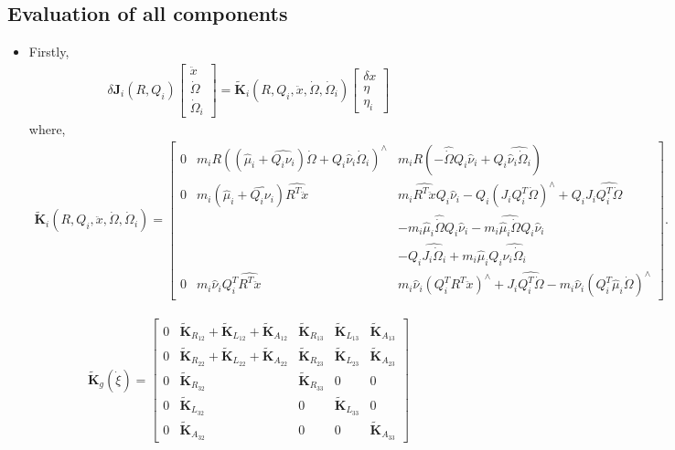 \documentclass[10pt]{article}
\begin{document}
\subsection*{Evaluation of all components}
\begin{itemize}
\item  Firstly,
\begin{align*}
\delta \mathbf{J}_i(R,Q_i) \begin{bmatrix}
\ddot{x} \\ \dot{\Omega} \\ \dot{\Omega}_i
\end{bmatrix} = 
\tilde{\mathbf{K}}_i(R, Q_i, \ddot{x}, \dot{\Omega}, \dot{\Omega}_i)
\begin{bmatrix}
\delta x \\ \eta \\ \eta_i
\end{bmatrix}
\end{align*}
where,
\begin{align*}
\tilde{\mathbf{K}}_i(R,Q_i,\ddot{x},\dot{\Omega},\dot{\Omega}_i) = 
\begin{bmatrix}
0 & m_i R ((\hat\mu_i+\widehat{Q_i\nu_i})\dot{\Omega} + Q_i\hat\nu_i\dot{\Omega}_i)^\wedge 
& m_i R( -\hat{\dot{\Omega}} Q_i \hat\nu_i + Q_i \widehat{\hat \nu_i \dot{\Omega}_i}) \\
0 & m_i(\hat\mu_i + \widehat{Q_i\nu_i})\widehat{R^T \ddot{x}}
& m_i\widehat{R^T\ddot{x}}Q_i\hat\nu_i - Q_i (J_iQ_i^T\dot{\Omega})^\wedge + Q_i J_i \widehat{Q_i^T\dot{\Omega}} \\
& & - m_i\hat\mu_i\hat{\dot{\Omega}} Q_i\hat\nu_i - m_i\widehat{\hat\mu_i\dot{\Omega}} Q_i \hat\nu_i \\
& & - Q_i \widehat{J_i\dot{\Omega}_i} + m_i \hat\mu_i Q_i \widehat{\hat\nu_i \dot{\Omega}_i} \\
0 & m_i \hat\nu_i Q_i^T \widehat{R^T\ddot{x}}
& m_i \hat\nu_i (Q_i^T R^T \ddot{x})^\wedge + J_i\widehat{Q_i^T\dot{\Omega}} - m_i\hat\nu_i (Q_i^T\hat\mu_i \dot{\Omega})^\wedge
\end{bmatrix}.
\end{align*}

\begin{align}
\tilde{\mathbf{K}}_g(\dot{\xi}) = \begin{bmatrix}
0 & \tilde{\mathbf{K}}_{R_{12}} + \tilde{\mathbf{K}}_{L_{12}} + \tilde{\mathbf{K}}_{A_{12}} & \tilde{\mathbf{K}}_{R_{13}} & \tilde{\mathbf{K}}_{L_{13}} & \tilde{\mathbf{K}}_{A_{13}}\\
0 & \tilde{\mathbf{K}}_{R_{22}} + \tilde{\mathbf{K}}_{L_{22}} + \tilde{\mathbf{K}}_{A_{22}} & \tilde{\mathbf{K}}_{R_{23}} & \tilde{\mathbf{K}}_{L_{23}} & \tilde{\mathbf{K}}_{A_{23}} \\
0 & \tilde{\mathbf{K}}_{R_{32}} & \tilde{\mathbf{K}}_{R_{33}} & 0 & 0 \\
0 & \tilde{\mathbf{K}}_{L_{32}} & 0 & \tilde{\mathbf{K}}_{L_{33}} & 0 \\
0 & \tilde{\mathbf{K}}_{A_{32}} & 0 & 0 & \tilde{\mathbf{K}}_{A_{33}}
\end{bmatrix}
\end{align}


\end{itemize}
\end{document}
